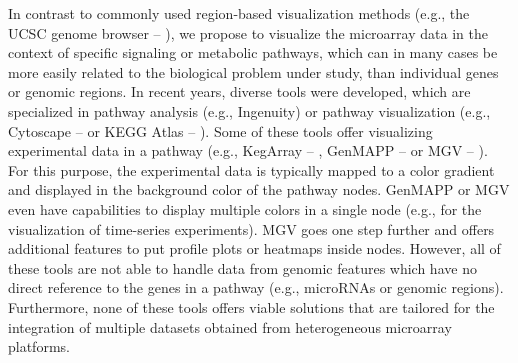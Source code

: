 \documentclass{bioinfo}
\begin{document}
In contrast to commonly used region-based visualization methods (e.g., the UCSC genome browser -- \citealp{UCSCBrowser}), we propose to visualize the microarray data in the context of specific signaling or metabolic pathways, which can in many cases be more easily related to the
biological problem under study, than individual genes or genomic regions.
%
In recent years, diverse tools were developed, which are specialized in pathway analysis (e.g., Ingenuity) or pathway visualization (e.g., Cytoscape -- \citealp{Cytoscape} or KEGG Atlas -- \citealp{KEGGAtlas}). Some of these tools offer visualizing experimental data in a pathway (e.g., KegArray -- \citealp{KEGG}, GenMAPP -- \citealp{GenMAPP} or MGV -- \citealp{Symons2011}). For this purpose, the experimental data is typically mapped to a color gradient and displayed in the background color of the pathway nodes. GenMAPP or MGV even have capabilities to display multiple colors in a single node (e.g., for the visualization of time-series experiments). MGV goes one step further and offers additional features to put profile plots or heatmaps inside nodes. However, all of these tools are not able to handle data from genomic features which have no direct reference to the genes in a pathway (e.g., microRNAs or genomic regions). Furthermore, none of these tools offers viable solutions that are tailored for the integration of multiple datasets obtained from heterogeneous microarray platforms.

\end{document}
